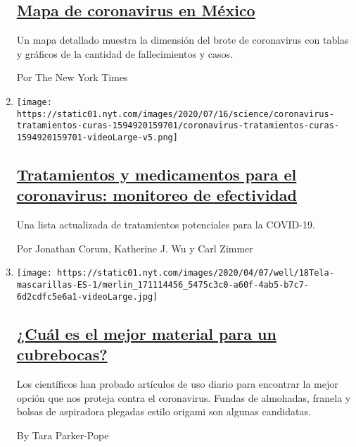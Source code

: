 \begin{enumerate}
  \hypertarget{mapa-de-coronavirus-en-muxe9xico}{%
  \subsection{\texorpdfstring{\href{/es/interactive/2020/espanol/america-latina/coronavirus-en-mexico.html}{Mapa
  de coronavirus en
  México}}{Mapa de coronavirus en México}}\label{mapa-de-coronavirus-en-muxe9xico}}

  Un mapa detallado muestra la dimensión del brote de coronavirus con
  tablas y gráficos de la cantidad de fallecimientos y casos.

  Por The New York Times
\item
  \texttt{[image: https://static01.nyt.com/images/2020/07/16/science/coronavirus-tratamientos-curas-1594920159701/coronavirus-tratamientos-curas-1594920159701-videoLarge-v5.png]}

  \hypertarget{tratamientos-y-medicamentos-para-el-coronavirus-monitoreo-de-efectividad}{%
  \subsection{\texorpdfstring{\href{/es/interactive/2020/science/coronavirus-tratamientos-curas.html}{Tratamientos
  y medicamentos para el coronavirus: monitoreo de
  efectividad}}{Tratamientos y medicamentos para el coronavirus: monitoreo de efectividad}}\label{tratamientos-y-medicamentos-para-el-coronavirus-monitoreo-de-efectividad}}

  Una lista actualizada de tratamientos potenciales para la COVID-19.

  Por Jonathan Corum, Katherine J. Wu y Carl Zimmer
\item
  \texttt{[image: https://static01.nyt.com/images/2020/04/07/well/18Tela-mascarillas-ES-1/merlin\_171114456\_5475c3c0-a60f-4ab5-b7c7-6d2cdfc5e6a1-videoLarge.jpg]}

  \hypertarget{cuuxe1l-es-el-mejor-material-para-un-cubrebocas}{%
  \subsection{\texorpdfstring{\href{/es/2020/04/18/espanol/material-mascarillas-virus.html}{¿Cuál
  es el mejor material para un
  cubrebocas?}}{¿Cuál es el mejor material para un cubrebocas?}}\label{cuuxe1l-es-el-mejor-material-para-un-cubrebocas}}

  Los científicos han probado artículos de uso diario para encontrar la
  mejor opción que nos proteja contra el coronavirus. Fundas de
  almohadas, franela y bolsas de aspiradora plegadas estilo origami son
  algunas candidatas.

  By Tara Parker-Pope
\end{enumerate}

